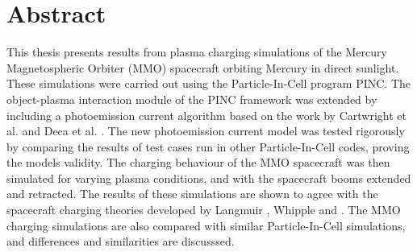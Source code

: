 \chapter{Abstract}
\label{sec:abstract}
This thesis presents results from plasma charging simulations of the Mercury Magnetospheric Orbiter (MMO) spacecraft orbiting Mercury in direct sunlight. These simulations were carried out using the Particle-In-Cell program PINC. The object-plasma interaction module of the PINC framework was extended by including a photoemission current algorithm based on the work by Cartwright et al. \parencite{Cartwright2000} and Deca et al. \parencite{Deca2013}. The new photoemission current model was tested rigorously by comparing the results of test cases run in other Particle-In-Cell codes, proving the models validity. The charging behaviour of the MMO spacecraft was then simulated for varying plasma conditions, and with the spacecraft booms extended and retracted. The results of these simulations are shown to agree with the spacecraft charging theories developed by Langmuir \parencite{Mott-Smith1926}, Whipple \parencite{Shipple1981} and \parencite{Garrett1981}. The MMO charging simulations are also compared with similar Particle-In-Cell simulations, and differences and similarities are discusssed.